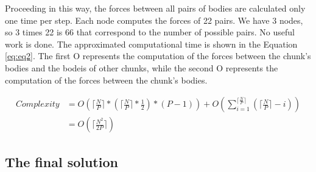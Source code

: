 \documentclass[a4paper]{article}
\begin{document}
Proceeding in this way, the forces between all pairs of bodies are calculated only one time per step. Each node computes the forces of 22 pairs. We have 3 nodes, so 3 times 22 is 66 that correspond to the number of possible pairs. No useful work is done. The approximated computational time is shown in the Equation \ref{eq:eq2}. The first O represents the computation of the forces between the chunk's bodies and the bodeis of other chunks, while the second O represents the computation of the forces between the chunk's bodies.

\begin{equation} \label{eq:eq2}
\begin{split}
Complexity & = O(\lceil\frac{N}{P}\rceil * (\lceil\frac{N}{P}\rceil * \frac{1}{2}) * (P-1)) +  O(\sum_{i=1}^{\lceil\frac{N}{P}\rceil} {(\lceil\frac{N}{P}\rceil-i)})\\
 & = O(\lceil\frac{N^2}{2P}\rceil)
\end{split}
\end{equation}

\subsection{The final solution}
\label{sec:comm_comp}
\end{document}
